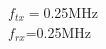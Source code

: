 \documentclass[preview]{standalone}
\begin{document}
\begin{center}
$f_{tx}=$0.25MHz\\$f_{rx}$=0.25MHz
\end{center}
\end{document}
